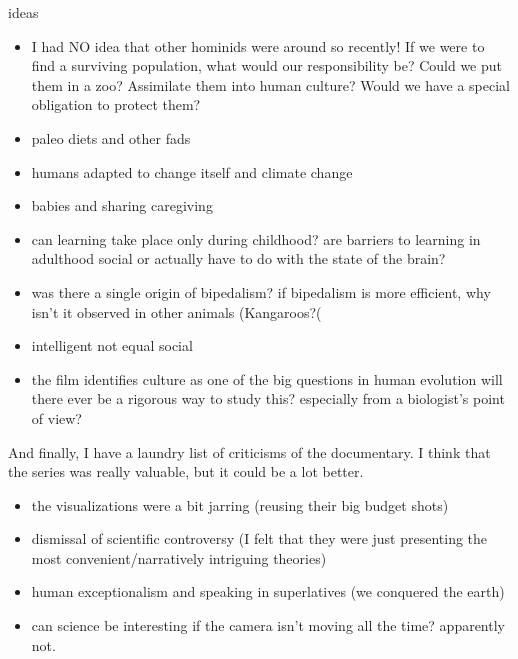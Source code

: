 ideas
\begin{itemize}
  \item I had NO idea that other hominids were around so recently! If we were to find a surviving population, what would our responsibility be? Could we put them in a zoo? Assimilate them into human culture? Would we have a special obligation to protect them?
  \item paleo diets and other fads
  \item humans adapted to change itself and climate change
  \item babies and sharing caregiving
  \item can learning take place only during childhood? are barriers to learning in adulthood social or actually have to do with the state of the brain?
  \item was there a single origin of bipedalism? if bipedalism is more efficient, why isn't it observed in other animals (Kangaroos?(
  \item intelligent not equal social
  \item the film identifies culture as one of the big questions in human evolution will there ever be a rigorous way to study this? especially from a biologist's point of view?
\end{itemize}

And finally, I have a laundry list of criticisms of the documentary. I think that the series was really valuable, but it could be a lot better.
\begin{itemize}
  \item the visualizations were a bit jarring (reusing their big budget shots)
  \item dismissal of scientific controversy (I felt that they were just presenting the most convenient/narratively intriguing theories)
  \item human exceptionalism and speaking in superlatives (we conquered the earth)
  \item can science be interesting if the camera isn't moving all the time? apparently not.
\end{itemize}